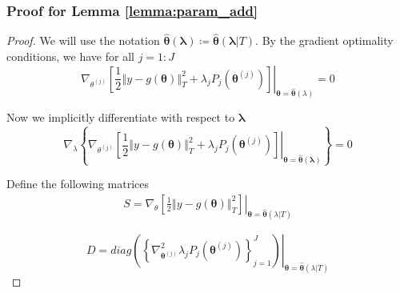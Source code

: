 \documentclass[12pt]{article}
\begin{document}
\subsubsection{Proof for Lemma \ref{lemma:param_add}}
\begin{proof}
	We will use the notation $\hat{\boldsymbol{\theta}}(\boldsymbol{\lambda}) \coloneqq \hat{\boldsymbol{\theta}}(\boldsymbol{\lambda} | T)$. By the gradient optimality conditions, we have for all $j=1:J$ 
	\begin{equation}
	\label{eq:grad_opt}
	\left.\nabla_{\theta^{(j)}} \left [
	\frac{1}{2}\left\Vert y-g(\boldsymbol{\theta})\right\Vert _{T}^{2}+\lambda_{j}P_{j}(\boldsymbol{\theta}^{(j)})
	\right ]
	\right|_{\boldsymbol{\theta}=\hat{\boldsymbol{\theta}}(\lambda)}=0
	\end{equation}
	
	Now we implicitly differentiate with respect to $\boldsymbol{\lambda}$ 
	\begin{equation}
	\label{eq:implicit_diff}
	\nabla_{\lambda}\left\{ \left.\nabla_{\theta^{(j)}}
	\left [
	\frac{1}{2}\left\Vert y-g(\boldsymbol{\theta})\right\Vert _{T}^{2}+\lambda_{j}P_{j}(\boldsymbol{\theta}^{(j)})
	\right ]
	\right|_{\boldsymbol{\theta}=\hat{\boldsymbol{\theta}}(\boldsymbol{\lambda})}\right\} =0
	\end{equation}
	
	Define the following matrices 
	\begin{eqnarray*}
		S = \left.\nabla_{\theta}\left [
		\frac{1}{2}\left\Vert y-g(\boldsymbol{\theta})\right\Vert _{T}^{2}
		\right ]
		\right|_{\boldsymbol{\theta}=\hat{\boldsymbol{\theta}}(\lambda | T)}
	\end{eqnarray*}
	
	\[
	D=\left.diag\left(\left\{ \nabla_{\boldsymbol{\theta}^{(j)}}^{2}\lambda_{j}P_{j}(\boldsymbol{\theta}^{(j)})\right\} _{j=1}^{J}\right)\right|_{\boldsymbol{\theta}=\hat{\boldsymbol{\theta}}(\lambda|T)}
	\]
	

\end{proof}
\end{document}
